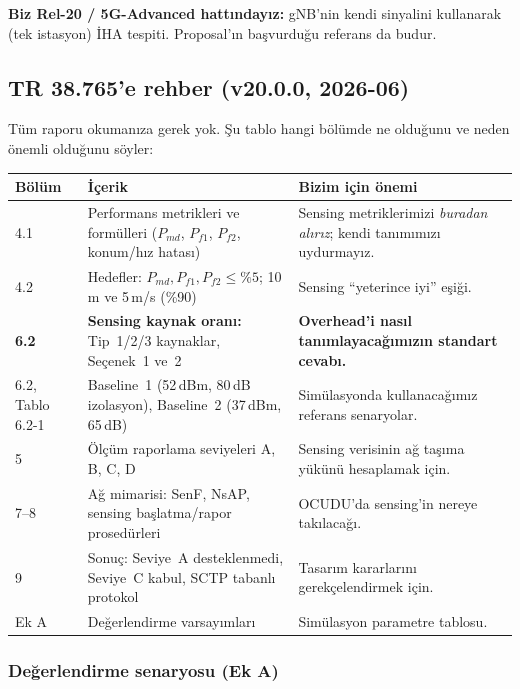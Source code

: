 \textbf{Biz Rel-20 / 5G-Advanced hattındayız:} gNB'nin kendi sinyalini kullanarak (tek istasyon) İHA tespiti. Proposal'ın başvurduğu referans da budur.

\subsection{TR 38.765'e rehber (v20.0.0, 2026-06)}

Tüm raporu okumanıza gerek yok. Şu tablo hangi bölümde ne olduğunu ve neden önemli olduğunu söyler:

\begingroup\sffamily\small
\begin{xltabular}{\textwidth}{@{}p{1.5cm}p{4.9cm}X@{}}
\toprule
\textbf{Bölüm} & \textbf{İçerik} & \textbf{Bizim için önemi} \\
 & Performans metrikleri ve formülleri ($P_{md}$, $P_{f1}$, $P_{f2}$, konum/hız hatası) & Sensing metriklerimizi \emph{buradan alırız}; kendi tanımımızı uydurmayız. \\
4.2 & Hedefler: $P_{md}, P_{f1}, P_{f2} \leq \%5$; 10\,m ve 5\,m/s (\%90) & Sensing ``yeterince iyi'' eşiği. \\
\textbf{6.2} & \textbf{Sensing kaynak oranı:} Tip~1/2/3 kaynaklar, Seçenek~1 ve~2 & \textbf{Overhead'i nasıl tanımlayacağımızın standart cevabı.} \\
6.2, Tablo 6.2-1 & Baseline~1 (52\,dBm, 80\,dB izolasyon), Baseline~2 (37\,dBm, 65\,dB) & Simülasyonda kullanacağımız referans senaryolar. \\
5 & Ölçüm raporlama seviyeleri A, B, C, D & Sensing verisinin ağ taşıma yükünü hesaplamak için. \\
7--8 & Ağ mimarisi: SenF, NsAP, sensing başlatma/rapor prosedürleri & OCUDU'da sensing'in nereye takılacağı. \\
9 & Sonuç: Seviye~A desteklenmedi, Seviye~C kabul, SCTP tabanlı protokol & Tasarım kararlarını gerekçelendirmek için. \\
Ek A & Değerlendirme varsayımları & Simülasyon parametre tablosu. \\
\bottomrule
\end{xltabular}
\endgroup

\subsubsection{Değerlendirme senaryosu (Ek A)}

